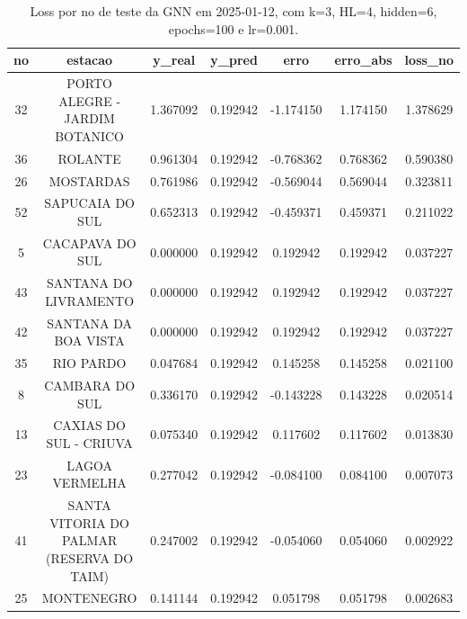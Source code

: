 \begin{table}[h]
\centering
\caption{Loss por no de teste da GNN em 2025-01-12, com k=3, HL=4, hidden=6, epochs=100 e lr=0.001.}
\label{tab:gnn_loss_k3_hl4_h6_e100_d20250112}
\begin{tabular}{ccccccc}
\toprule
no & estacao & y\_real & y\_pred & erro & erro\_abs & loss\_no \\
\midrule
32 & PORTO ALEGRE - JARDIM BOTANICO & 1.367092 & 0.192942 & -1.174150 & 1.174150 & 1.378629 \\
36 & ROLANTE & 0.961304 & 0.192942 & -0.768362 & 0.768362 & 0.590380 \\
26 & MOSTARDAS & 0.761986 & 0.192942 & -0.569044 & 0.569044 & 0.323811 \\
52 & SAPUCAIA DO SUL & 0.652313 & 0.192942 & -0.459371 & 0.459371 & 0.211022 \\
5 & CACAPAVA DO SUL & 0.000000 & 0.192942 & 0.192942 & 0.192942 & 0.037227 \\
43 & SANTANA DO LIVRAMENTO & 0.000000 & 0.192942 & 0.192942 & 0.192942 & 0.037227 \\
42 & SANTANA DA BOA VISTA & 0.000000 & 0.192942 & 0.192942 & 0.192942 & 0.037227 \\
35 & RIO PARDO & 0.047684 & 0.192942 & 0.145258 & 0.145258 & 0.021100 \\
8 & CAMBARA DO SUL & 0.336170 & 0.192942 & -0.143228 & 0.143228 & 0.020514 \\
13 & CAXIAS DO SUL - CRIUVA & 0.075340 & 0.192942 & 0.117602 & 0.117602 & 0.013830 \\
23 & LAGOA VERMELHA & 0.277042 & 0.192942 & -0.084100 & 0.084100 & 0.007073 \\
41 & SANTA VITORIA DO PALMAR (RESERVA DO TAIM) & 0.247002 & 0.192942 & -0.054060 & 0.054060 & 0.002922 \\
25 & MONTENEGRO & 0.141144 & 0.192942 & 0.051798 & 0.051798 & 0.002683 \\
\bottomrule
\end{tabular}
\end{table}
